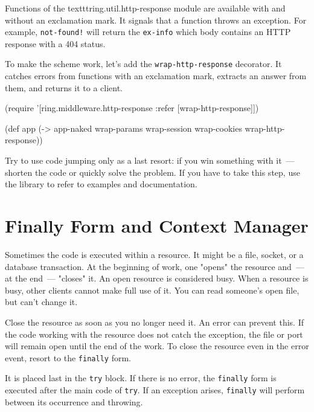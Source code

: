 Functions of the texttt{ring.util.http\--res\-ponse} module are available with and without an exclamation mark. It signals that a function throws an exception. For example, \verb|not-found!| will return the \verb|ex-info| which body contains an HTTP response with a 404 status.


To make the scheme work, let's add the \verb|wrap-http-response| decorator. It catches errors from functions with an exclamation mark, extracts an answer from them, and returns it to a client.

\begin{english}
  \begin{clojure}
(require '[ring.middleware.http-response
           :refer [wrap-http-response]])

(def app
  (-> app-naked
      wrap-params
      wrap-session
      wrap-cookies
      wrap-http-response))
  \end{clojure}
\end{english}

Try to use code jumping only as a last resort: if you win something with it~--- shorten the code or quickly solve the problem. If you have to take this step, use the library to refer to examples and documentation.


\section{Finally Form and Context Manager}

Sometimes the code is executed within a resource. It might be a file, socket, or a database transaction. At the beginning of work, one "opens" the resource and~--- at the end~--- "closes" it. An open resource is considered busy. When a resource is busy, other clients cannot make full use of it. You can read someone's open file, but can't change it.

Close the resource as soon as you no longer need it. An error can prevent this. If the code working with the resource does not catch the exception, the file or port will remain open until the end of the work. To close the resource even in the error event, resort to the \verb|finally| form.

It is placed last in the \verb|try| block. If there is no error, the \verb|finally| form is executed after the main code of \verb|try|. If an exception arises, \verb|finally| will perform between its occurrence and throwing.

